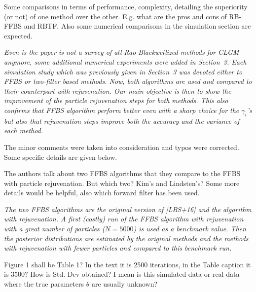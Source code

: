 \vspace{.5cm}

\noindent Some comparisons in terms of performance, complexity, detailing the superiority (or not) of one method over the other. E.g. what are the pros and cons of RB-FFBS and RBTF. Also some numerical comparisons in the simulation section are expected.

\vspace{.2cm}

{\em
\noindent Even is the paper is not a survey of all Rao-Blackwellized methods for CLGM anymore, some additional numerical experiments were added in Section~3. Each simulation study which was previously given in Section~3 was devoted either to FFBS or two-filter based methods. Now, both algorithms are used and compared to their counterpart with rejuvenation. Our main objective is then to show the improvement of the particle rejuvenation steps for both methods.  This also confirms that FFBS algorithm perform better even with a sharp choice for the  $\gamma_i$'s but also that rejuvenation steps improve both the accuracy and the variance of each method.
}

\vspace{.5cm}

\noindent The minor comments were taken into consideration and typos were corrected. Some specific details are given below.
 
\vspace{.5cm}
 
\noindent The authors talk about two FFBS algorithms that they compare to the FFBS with
particle rejuvenation. But which two? Kim's and Lindsten's? Some more details
would be helpful, also which forward filter has been used.

\vspace{.2cm}

{\em 
\noindent The two FFBS algorithms are the original version of [LBS+16]  and the algorithm with rejuvenation.
A first (costly) run of the FFBS algorithm with rejuvenation with a great number of particles ($N=5000$) is used as a benchmark value. Then the posterior distributions are estimated by the original methods and the methods with rejuvenation with fewer particles and compared to this  benchmark run.
}

\vspace{.5cm}

\noindent Figure 1 shall be Table 1? In the text it is 2500 iterations, in the Table
caption it is 3500? How is Std. Dev obtained? I mean is this simulated data or real data where
the true parameters $\theta$ are usually unknown?

